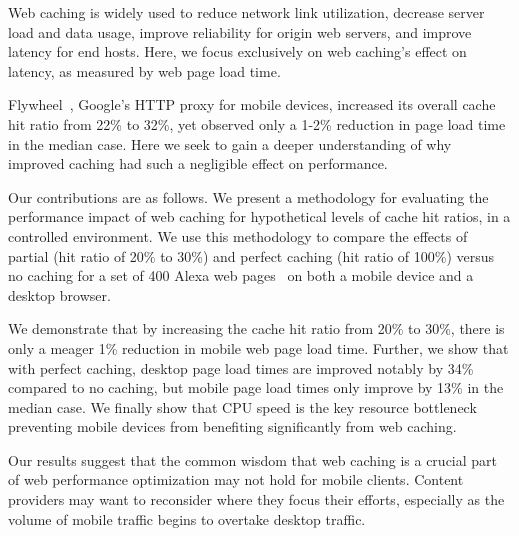 \label{intro}
Web caching is widely used to reduce network link utilization, decrease server load and data usage, improve reliability for origin web servers, and improve latency for end hosts.
Here, we focus exclusively on web caching's effect on latency, as measured by web page load time.

Flywheel~\cite{flywheel}, Google's HTTP proxy for mobile devices, increased
its overall cache hit ratio from 22\% to 32\%, yet observed only a 1-2\% reduction in page load time in the median case.
Here we seek to gain a deeper understanding of why improved caching had such a negligible effect on performance.

Our contributions are as follows.
We present a methodology
for evaluating the performance impact of web caching for hypothetical levels of cache hit ratios, in a controlled environment. We use this methodology to compare the effects of partial (hit ratio of 20\% to 30\%) and
perfect caching (hit ratio of 100\%) versus no caching for a set of 400 Alexa web pages~\cite{alexa} on both a mobile device and a desktop browser.

We demonstrate that by increasing the cache hit ratio from 20\% to 30\%, there is only a meager 1\% reduction in mobile web page load time.
Further, we show that with perfect caching, desktop page load times are improved notably by 34\% compared to no caching, but mobile page load times only improve by 13\% in the median case.
We finally show that CPU speed is the key resource bottleneck preventing mobile devices from benefiting significantly from web caching.

Our results suggest that the common wisdom that web caching is a crucial part of web performance optimization may not hold for mobile clients. Content providers may want to reconsider where they focus their efforts, especially as the volume of mobile traffic begins to overtake desktop traffic.
